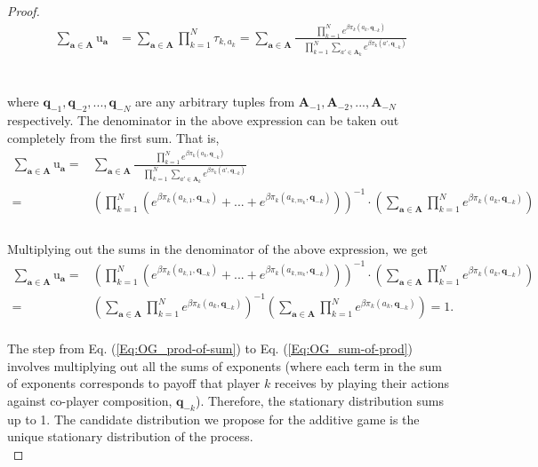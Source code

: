 \documentclass[11pt]{article}
\theoremstyle{plainCl1}
\theoremstyle{plainCl2}
\newcommand{\A}{\mathbf{A}}
\newcommand{\abf}{\mathbf{a}}
\newcommand{\qbf}{\mathbf{q}}
\begin{document}
\begin{proof}
\begin{align}
\sum_{\abf \in \A} \mathrm{u}_\abf &= \sum_{\abf \in \A} \prod_{k=1}^N \tau_{k,a_k} = \sum_{\abf \in \A} \frac{\displaystyle \prod_{k=1}^N e^{\beta \pi_k(a_k, \qbf_{-k})}}{\displaystyle \quad \prod_{k=1}^N \sum_{a' \in \A_k} e^{\beta \pi_k(a',\qbf_{-k})}}
\end{align}
\noindent \\ \\ where $\qbf_{-1}, \qbf_{-2},...,\qbf_{-N}$ are any arbitrary tuples from $\A_{-1}, \A_{-2},...,\A_{-N}$ respectively. The denominator in the above expression can be taken out completely from the first sum. That is, \\
\begin{align}
\sum_{\abf \in \A} \mathrm{u}_\abf = &\sum_{\abf \in \A} \frac{\displaystyle \prod_{k=1}^N e^{\beta \pi_k(a_k, \qbf_{-k})}}{\displaystyle \quad \prod_{k=1}^N \sum_{a' \in \A_k} e^{\beta \pi_k(a',\qbf_{-k})}} \\[15pt]
=& \left( \displaystyle \prod_{k=1}^N \left( e^{\beta \pi_k(a_{k,1}, \qbf_{-k})}+... + e^{\beta \pi_k(a_{k,m_k}, \qbf_{-k})} \right) \right)^{-1} \cdot \left( \sum_{\abf \in \A} \displaystyle \prod_{k=1}^N e^{\beta \pi_k(a_k, \qbf_{-k})} \right) \\
\end{align} \\
\noindent Multiplying out the sums in the denominator of the above expression, we get
\begin{align}
\label{Eq:OG_prod-of-sum}
\sum_{\abf \in \A} \mathrm{u}_\abf =& \left( \displaystyle \prod_{k=1}^N \left( e^{\beta \pi_k(a_{k,1}, \qbf_{-k})}+... + e^{\beta \pi_k(a_{k,m_k}, \qbf_{-k})} \right) \right)^{-1} \cdot \left( \sum_{\abf \in \A} \displaystyle \prod_{k=1}^N e^{\beta \pi_k(a_k, \qbf_{-k})} \right) \\[10pt]
\label{Eq:OG_sum-of-prod}
=& \left( \sum_{\abf \in \A} \displaystyle \prod_{k=1}^N e^{\beta \pi_k(a_k, \qbf_{-k})}  \right)^{-1} \left( \sum_{\abf \in \A} \displaystyle \prod_{k=1}^N e^{\beta \pi_k(a_k, \qbf_{-k})}  \right) = 1 .
\end{align} \\ 
\noindent The step from Eq. (\ref{Eq:OG_prod-of-sum}) to Eq. (\ref{Eq:OG_sum-of-prod}) involves multiplying out all the sums of exponents (where each term in the sum of exponents corresponds to payoff that player $k$ receives by playing their actions against co-player composition, $\qbf_{-k}$). Therefore, the stationary distribution sums up to 1. The candidate distribution we propose for the additive game is the unique stationary distribution of the process.\\
\end{proof}
\end{document}
